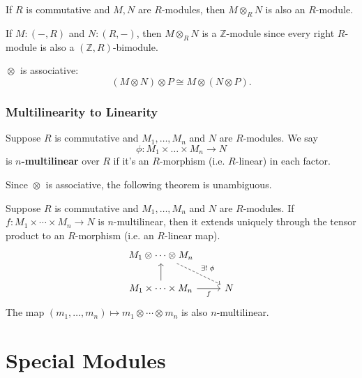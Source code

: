 \documentclass[twoside,10pt]{report}
\begin{document}
\begin{cor}
If $R$ is commutative and $M,N$ are $R$-modules, then $M \otimes_{R}N$ is also an $R$-module.
\end{cor}

\begin{note}[]
	If $M:(-,R)$ and $N:(R,-)$, then $M \otimes_{R}N$ is a $\mathbb{Z}$-module since every right $R$-module is also a $(\mathbb{Z},R)$-bimodule.
\end{note}

\begin{prop}
	$\otimes_{}$ is associative:
	\[
		(M \otimes N)\otimes P \cong M\otimes(N\otimes P).
	\] 
\end{prop}


\newpage
\subsection{Multilinearity to Linearity}

\begin{defn}[]
Suppose $R$ is commutative and ${M}_1, \dots, {M}_{n}$ and $N$ are $R$-modules. We say
\[
\phi:{M}_1 \times \dots \times {M}_{n} \to N
\] is \textbf{$n$-multilinear} over $R$ if it's an $R$-morphism (i.e. $R$-linear) in each factor.
\end{defn}

Since $\otimes_{}$ is associative, the following theorem is unambiguous.

\begin{thrm}[]
Suppose $R$ is commutative and ${M}_1, \dots, {M}_{n}$ and $N$ are $R$-modules. If $f:M_1\times \cdots \times M_n \to N$ is $n$-multilinear, then it extends uniquely through the tensor product to an $R$-morphism (i.e. an $R$-linear map).
\[
\begin{tikzcd}
	M_1 \otimes_{}\cdots \otimes_{}M_n \arrow[dr,dashed,"\exists!\;\phi"] \\
	M_1\times \cdots \times M_n \uar \rar["f"'] & N
\end{tikzcd}
\] The map $(m_1,\dots,m_n) \mapsto m_1\otimes_{}\cdots \otimes_{}m_n$ is also $n$-multilinear.
\end{thrm}



\chapter{Special Modules}
\end{document}
